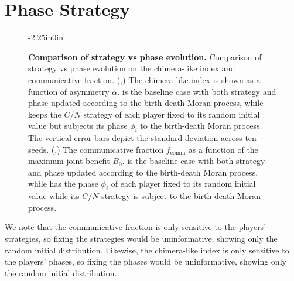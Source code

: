 \documentclass[10pt,letterpaper]{article}
\begin{document}
\section{Phase \vs{} Strategy}
\begin{figure}
\begin{adjustwidth}{-2.25in}{0in}
  \centering
  \begin{subcaptiongroup}
      {\label{fig:frac-comm-phase-fixed}\captiontext*{}}{%
      {\label{fig:frac-comm-baseline}\captiontext*{}}{%
      {\label{fig:chimera-strategy-fixed}\captiontext*{}}{%
      {\label{fig:chimera-baseline}\captiontext*{}}{%
		{}%
		}}}}
  \end{subcaptiongroup}
  \caption{
    \textbf{
			Comparison of strategy vs phase evolution.
    }
		Comparison of strategy vs phase evolution on the chimera-like index
		and communicative fraction.
		(,)
		The chimera-like index is shown as a function of asymmetry $\alpha$.
		is the baseline case with both strategy and phase updated
		according to the birth-death Moran process,
		while
		keeps the $C/N$ strategy of each player fixed
		to its random initial value but subjects its phase $\phi_i$
		to the birth-death Moran process.
		The vertical error bars depict the standard deviation
		across ten seeds.
		(,)
		The communicative fraction $f_{\text{comm}}$ as a function
		of the maximum joint benefit $B_0$.
		is the baseline case with both strategy and phase updated
		according to the birth-death Moran process,
		while
		has the phase $\phi_i$ of each player fixed
		to its random initial value while its $C/N$ strategy is subject
		to the birth-death Moran process.
  }\label{fig:phase-vs-strategy}
\end{adjustwidth}
\end{figure}

We note that the communicative fraction is only sensitive to the
players' strategies, so fixing the strategies would be uninformative,
showing only the random initial distribution.
Likewise, the chimera-like index is only sensitive to the players'
phases,
so fixing the phases would be uninformative, showing only the random
initial distribution.
\end{document}
